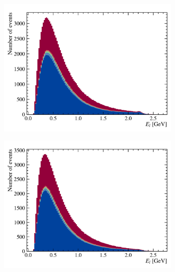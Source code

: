 \begin{figure}[htb]
\begin{subfigure}[b]{0.32\textwidth}
        \includegraphics[width=\textwidth]{figs-fit-fit-templates/data-driven-plots/misid/D0_el.pdf}
    \end{subfigure}
    \hfill
    \begin{subfigure}[b]{0.32\textwidth}
        \centering
        \includegraphics[width=\textwidth]{figs-fit-fit-templates/data-driven-plots/misid/D0_el_smr.pdf}
    \end{subfigure}
    \hfill
    \begin{subfigure}[b]{0.32\textwidth}
        \centering

\end{subfigure}
\end{figure}
